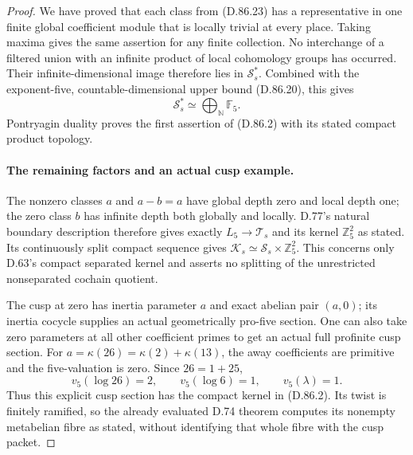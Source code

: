 \begin{proof}
We have proved that each class from (D.86.23) has a
representative in one finite global coefficient module
that is locally trivial at every place. Taking maxima
gives the same assertion for any finite collection.
No interchange of a filtered union with an infinite
product of local cohomology groups has occurred.
Their infinite-dimensional image therefore lies in
\(\mathcal S_s^*\). Combined with the exponent-five,
countable-dimensional upper bound (D.86.20), this gives
\[
                     \mathcal S_s^*\simeq
                            \bigoplus_{\mathbb N}\mathbb F_5.
\]
Pontryagin duality proves the first assertion of (D.86.2)
with its stated compact product topology.

\paragraph{The remaining factors and an actual cusp example.}
The nonzero classes \(a\) and \(a-b=a\) have global
depth zero and local depth one; the zero class \(b\)
has infinite depth both globally and locally. D.77's
natural boundary description therefore gives exactly
\(L_5\to\mathcal T_s\) and its kernel \(\mathbb Z_5^2\)
as stated. Its continuously split compact sequence gives
\(\mathcal K_s\simeq\mathcal S_s\times\mathbb Z_5^2\).
This concerns only D.63's compact separated kernel and
asserts no splitting of the unrestricted nonseparated
cochain quotient.

The cusp at zero has inertia parameter \(a\) and exact
abelian pair \((a,0)\); its inertia cocycle supplies an
actual geometrically pro-five section. One can also take
zero parameters at all other coefficient primes to get
an actual full profinite cusp section.
For \(a=\kappa(26)=\kappa(2)+\kappa(13)\), the away
coefficients are primitive and the five-valuation is zero.
Since \(26=1+25\),
\[
                 v_5(\log26)=2,\qquad v_5(\log6)=1,
                 \qquad v_5(\lambda)=1.
\]
Thus this explicit cusp section has the compact kernel
in (D.86.2). Its twist is finitely ramified, so the
already evaluated D.74 theorem computes its nonempty
metabelian fibre as stated, without identifying that
whole fibre with the cusp packet.
\end{proof}
